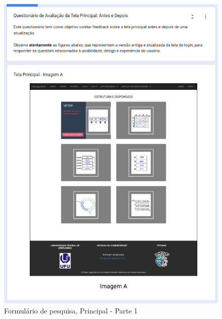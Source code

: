 \begin{figure}[!h]
	\begin{center}
	    \includegraphics[scale=0.6]{figs/Form/13.png}
	\end{center}
	\caption{\label{AP_PP01}Formulário de pesquisa, Principal - Parte 1}
\end{figure}

\newpage

